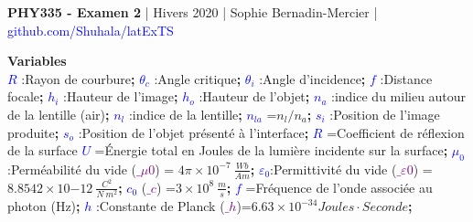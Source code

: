 \documentclass[letterpaper,8pt]{extarticle}
\newcommand{\txt}[1]{\small{#1}}
\begin{document}
\begin{center}
    {\small{\textbf{PHY335 - Examen 2} | Hivers 2020 | Sophie Bernadin-Mercier | \textcolor{blue}{github.com/Shuhala/latExTS}}}    
\end{center}

\vspace{-0.5cm}

\begin{multicols*}{3}
\textbf{Variables}\\
\txt{\footnotesize
    \def \skip {\textbf{;}\hskip5pt}
    \textcolor{blue}{$R$}           :Rayon de courbure\skip
    \textcolor{blue}{$\theta_c$}    :Angle critique\skip
    \textcolor{blue}{$\theta_i$}    :Angle d'incidence\skip
    \textcolor{blue}{$f$}           :Distance focale\skip
    \textcolor{blue}{$h_i$}         :Hauteur de l'image\skip
    \textcolor{blue}{$h_o$}         :Hauteur de l'objet\skip
    \textcolor{blue}{$n_a$}         :indice du milieu autour de la lentille (air)\skip
    \textcolor{blue}{$n_l$}         :indice de la lentille\skip
    \textcolor{blue}{$n_{la}$}      =$n_l/n_a$\skip
    \textcolor{blue}{$s_i$}         :Position de l'image produite\skip
    \textcolor{blue}{$s_o$}         :Position de l'objet présenté à l'interface\skip
    \textcolor{blue}{$R$}           =Coefficient de réflexion de la surface
    \textcolor{blue}{$U$}           =Énergie total en Joules de la lumière incidente sur la surface\skip
    \textcolor{blue}{$\mu_0$}       :Perméabilité du vide (\textcolor{purple}{$\_\mu0$}) = $4\pi\times10^{-7}\ \frac{Wb}{Am}$\skip
    \textcolor{blue}{$\varepsilon_0$}:Permittivité du vide (\textcolor{purple}{$\_\varepsilon0$}) = $8.8542\times10{-12}\ \frac{C^2}{N\ m^2}$\skip
    \textcolor{blue}{$c_0$}         (\textcolor{purple}{$\_c$}) =$3\times10^8\ \frac{m}{s}$\skip
    \textcolor{blue}{$f$}           =Fréquence de l'onde associée au photon (Hz)\skip
    \textcolor{blue}{$h$}           :Constante de Planck (\textcolor{purple}{$\_h$})=$6.63\times 10^{-34} Joules \cdot Seconde$\skip
}





\vfill\columnbreak






\vfill\columnbreak


\end{multicols*}
\end{document}
